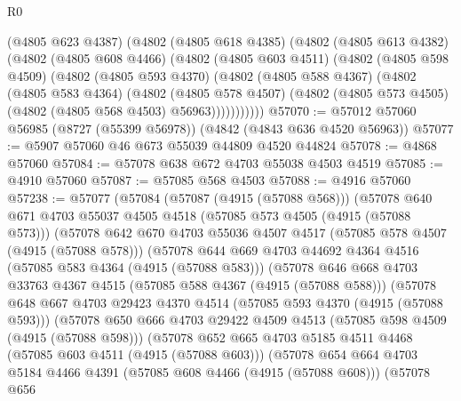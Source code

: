 \begin{lexlean}{R0}
\begin{coremodule}
    (@4805 @623 @4387)
    (@4802
      (@4805 @618 @4385)
      (@4802
        (@4805 @613 @4382)
        (@4802
          (@4805 @608 @4466)
          (@4802
            (@4805 @603 @4511)
            (@4802
              (@4805 @598 @4509)
              (@4802
                (@4805 @593 @4370)
                (@4802
                  (@4805 @588 @4367)
                  (@4802
                    (@4805 @583 @4364)
                    (@4802
                      (@4805 @578 @4507)
                      (@4802 (@4805 @573 @4505) (@4802 (@4805 @568 @4503) @56963)))))))))))
@57070 := @57012 @57060 @56985 (@8727 (@55399 @56978)) (@4842 (@4843 @636 @4520 @56963))
@57077 := @5907 @57060 @46 @673 @55039 @44809 @4520 @44824
@57078 := @4868 @57060
@57084 := @57078 @638 @672 @4703 @55038 @4503 @4519
@57085 := @4910 @57060
@57087 := @57085 @568 @4503
@57088 := @4916 @57060
@57238 := @57077
    (@57084
      (@57087 (@4915 (@57088 @568)))
      (@57078
        @640
        @671
        @4703
        @55037
        @4505
        @4518
        (@57085 @573 @4505 (@4915 (@57088 @573)))
        (@57078
          @642
          @670
          @4703
          @55036
          @4507
          @4517
          (@57085 @578 @4507 (@4915 (@57088 @578)))
          (@57078
            @644
            @669
            @4703
            @44692
            @4364
            @4516
            (@57085 @583 @4364 (@4915 (@57088 @583)))
            (@57078
              @646
              @668
              @4703
              @33763
              @4367
              @4515
              (@57085 @588 @4367 (@4915 (@57088 @588)))
              (@57078
                @648
                @667
                @4703
                @29423
                @4370
                @4514
                (@57085 @593 @4370 (@4915 (@57088 @593)))
                (@57078
                  @650
                  @666
                  @4703
                  @29422
                  @4509
                  @4513
                  (@57085 @598 @4509 (@4915 (@57088 @598)))
                  (@57078
                    @652
                    @665
                    @4703
                    @5185
                    @4511
                    @4468
                    (@57085 @603 @4511 (@4915 (@57088 @603)))
                    (@57078
                      @654
                      @664
                      @4703
                      @5184
                      @4466
                      @4391
                      (@57085 @608 @4466 (@4915 (@57088 @608)))
                      (@57078
                        @656

\end{coremodule}
\end{lexlean}
